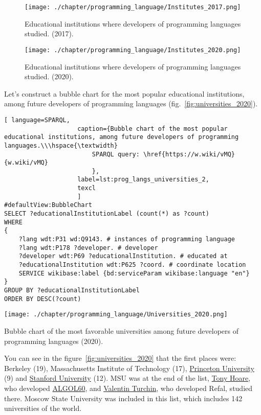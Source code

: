 \begin{figure}[h]
\centering
	\texttt{[image: ./chapter/programming\_language/Institutes\_2017.png]}
	\caption{Educational institutions where developers of programming languages studied. (2017).}
	\label{fig:institutes_2017}
\end{figure}

\begin{figure}[h]
\centering
	\texttt{[image: ./chapter/programming\_language/Institutes\_2020.png]}
	\caption{Educational institutions where developers of programming languages studied. (2020).}
	\label{fig:institutes_2020}
\end{figure}

Let's construct a bubble chart for the most popular educational institutions, among future developers of programming languages (fig.~\ref{fig:universities_2020}). 

\begin{lstlisting}[ language=SPARQL, 
                    caption={Bubble chart of the most popular educational institutions, among future developers of programming languages.\\\hspace{\textwidth}
                        SPARQL query: \href{https://w.wiki/vMQ}{w.wiki/vMQ}
                        },
                    label=lst:prog_langs_universities_2,
                    texcl 
                    ]
#defaultView:BubbleChart
SELECT ?educationalInstitutionLabel (count(*) as ?count)
WHERE
{
	?lang wdt:P31 wd:Q9143. # instances of programming language
	?lang wdt:P178 ?developer. # developer
	?developer wdt:P69 ?educationalInstitution. # educated at
	?educationalInstitution wdt:P625 ?coord. # coordinate location
	SERVICE wikibase:label {bd:serviceParam wikibase:language "en"} 	
}
GROUP BY ?educationalInstitutionLabel
ORDER BY DESC(?count)
\end{lstlisting}%

\begin{marginfigure}[-2cm]
	\texttt{[image: ./chapter/programming\_language/Universities\_2020.png]}
	\caption{Bubble chart of the most favorable universities among future developers of programming languages (2020).}
	\label{fig:universities_2020}
\end{marginfigure}

You can see in the figure~\ref{fig:universities_2020} that the first places were: Berkeley (19), Massachusetts Institute of Technology (17), \href{https://en.wikipedia.org/wiki/Princeton_University}{Princeton University} (9) and \href{https://en.wikipedia.org/wiki/Stanford_University}{Stanford University} (12). MSU was at the end of the list, \href{https://en.wikipedia.org/wiki/Tony_Hoare}{Tony Hoare}, who developed \href{https://en.wikipedia.org/wiki/ALGOL}{ALGOL60}, and \href{https://en.wikipedia.org/wiki/Valentin_Turchin}{Valentin Turchin}, who developed Refal, studied there. Moscow State University was included in this list, which includes 142 universities of the world.

